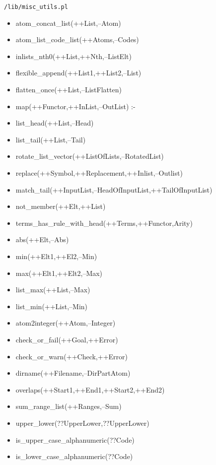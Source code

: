 \texttt{/lib/misc\_utils.pl} \\
%
\begin{itemize}
\item atom\_concat\_list(++List,--Atom)
\item atom\_list\_code\_list(++Atoms,--Codes)
\item inlists\_nth0(++List,++Nth,--ListElt)
\item flexible\_append(++List1,++List2,--List)
\item flatten\_once(++List,--ListFlatten)
\item map(++Functor,++InList,--OutList) :-
\item list\_head(++List,--Head)
\item list\_tail(++List,--Tail)
\item rotate\_list\_vector(++ListOfLists,--RotatedList) 
\item replace(++Symbol,++Replacement,++Inlist,--Outlist)
\item match\_tail(++InputList,--HeadOfInputList,++TailOfInputList)
\item not\_member(++Elt,++List)
\item terms\_has\_rule\_with\_head(++Terms,++Functor,Arity)
\item abs(++Elt,--Abs)  %
\item min(++Elt1,++El2,--Min)   %
\item max(++Elt1,++Elt2,--Max)  %
\item list\_max(++List,--Max)
\item list\_min(++List,--Min)
\item atom2integer(++Atom,--Integer)
\item check\_or\_fail(++Goal,++Error)
\item check\_or\_warn(++Check,++Error)
\item dirname(++Filename,--DirPartAtom)
\item overlaps(++Start1,++End1,++Start2,++End2)
\item sum\_range\_list(++Ranges,--Sum)
\item upper\_lower(??UpperLower,??UpperLower)
\item is\_upper\_case\_alphanumeric(??Code)
\item is\_lower\_case\_alphanumeric(??Code)
\end{itemize}
